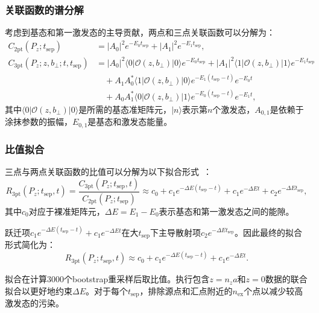 \documentclass[12pt,a4paper]{ctexart}
\theoremstyle{definition}
\newcommand{\tsep}{t_{\text{sep}}}
\newcommand{\Pz}{P_z}
\newcommand{\bperp}{b_\perp}
\begin{document}
\subsubsection{关联函数的谱分解}

考虑到基态和第一激发态的主导贡献，两点和三点关联函数可以分解为：
\begin{align}
    C_{2\text{pt}}(\Pz; \tsep) &= |A_0|^2 e^{-E_0 \tsep} + |A_1|^2 e^{-E_1 \tsep}, \label{eq:C2pt_decomp}\\
    C_{3\text{pt}}(\Pz; z, \bperp; t, \tsep) &= |A_0|^2 \langle 0 | \mathcal{O}(z, \bperp) | 0 \rangle e^{-E_0 \tsep} + |A_1|^2 \langle 1 | \mathcal{O}(z, \bperp) | 1 \rangle e^{-E_1 \tsep} \nonumber\\
    &\quad + A_1 A_0^* \langle 1 | \mathcal{O}(z, \bperp) | 0 \rangle e^{-E_1(\tsep - t)} e^{-E_0 t} \nonumber\\
    &\quad + A_0 A_1^* \langle 0 | \mathcal{O}(z, \bperp) | 1 \rangle e^{-E_0(\tsep - t)} e^{-E_1 t}, \label{eq:C3pt_decomp}
\end{align}
其中$\langle 0 | \mathcal{O}(z, \bperp) | 0 \rangle$是所需的基态准矩阵元，$|n\rangle$表示第$n$个激发态，$A_{0,1}$是依赖于涂抹参数的振幅，$E_{0,1}$是基态和激发态能量。

\subsubsection{比值拟合}

三点与两点关联函数的比值可以分解为以下拟合形式~\cite{Chen2025gluon}：
\begin{equation}\label{eq:ratio_fit}
    R_{3\text{pt}}(\Pz; \tsep, t) = \frac{C_{3\text{pt}}(\Pz; \tsep, t)}{C_{2\text{pt}}(\Pz; \tsep)} \approx c_0 + c_1 e^{-\Delta E(\tsep - t)} + c_1 e^{-\Delta E t} + c_2 e^{-\Delta E \tsep},
\end{equation}
其中$c_0$对应于裸准矩阵元，$\Delta E = E_1 - E_0$表示基态和第一激发态之间的能隙。

跃迁项$c_1 e^{-\Delta E(\tsep - t)} + c_1 e^{-\Delta E t}$在大$\tsep$下主导散射项$c_2 e^{-\Delta E \tsep}$。因此最终的拟合形式简化为：
\begin{equation}\label{eq:ratio_fit_simple}
    R_{3\text{pt}}(\Pz; \tsep, t) \approx c_0 + c_1 e^{-\Delta E(\tsep - t)} + c_1 e^{-\Delta E t}.
\end{equation}

拟合在计算3000个bootstrap重采样后取比值。执行包含$z = n_z a$和$z = 0$数据的联合拟合以更好地约束$\Delta E$。对于每个$\tsep$，排除源点和汇点附近的$n_{\text{ex}}$个点以减少较高激发态的污染。
\end{document}
